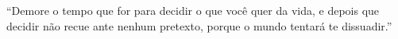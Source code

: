 \enquote{Demore o tempo que
	for para decidir o que
	você quer da vida, e
	depois que decidir
	não recue ante
	nenhum pretexto,
	porque o mundo
	tentará te dissuadir.}


